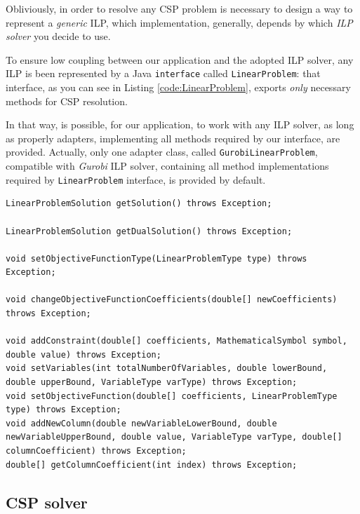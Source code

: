 \documentclass[10pt,a4paper]{article}
\begin{document}
Obliviously, in order to resolve any CSP problem is necessary to design a way to represent a \textit{generic} ILP, which implementation, generally, depends by which \textit{ILP solver} you decide to use.

To ensure low coupling between our application and the adopted ILP solver, any ILP is been represented by a Java \texttt{interface} called \texttt{LinearProblem}: that interface, as you can see in Listing \ref{code:LinearProblem}, exports \textit{only} necessary methods for CSP resolution.

In that way, is possible, for our application, to work with any ILP solver, as long as properly adapters, implementing all methods required by our interface, are provided. Actually, only one adapter class, called \texttt{GurobiLinearProblem}, compatible with \textit{Gurobi} ILP solver, containing all method implementations required by \texttt{LinearProblem} interface, is provided by default.

\begin{adjustwidth}{-2cm}{-2cm}
\begin{lstlisting}[frame=lines, caption={Some methods exported by \texttt{LinearProblem} interface.}, label={code:LinearProblem}]
LinearProblemSolution getSolution() throws Exception; 
  
LinearProblemSolution getDualSolution() throws Exception;

void setObjectiveFunctionType(LinearProblemType type) throws Exception;

void changeObjectiveFunctionCoefficients(double[] newCoefficients) throws Exception;

void addConstraint(double[] coefficients, MathematicalSymbol symbol, double value) throws Exception;
void setVariables(int totalNumberOfVariables, double lowerBound, double upperBound, VariableType varType) throws Exception;
void setObjectiveFunction(double[] coefficients, LinearProblemType type) throws Exception;
void addNewColumn(double newVariableLowerBound, double newVariableUpperBound, double value, VariableType varType, double[] columnCoefficient) throws Exception;
double[] getColumnCoefficient(int index) throws Exception;
\end{lstlisting}
\end{adjustwidth} 

\subsection{CSP solver}
\end{document}
